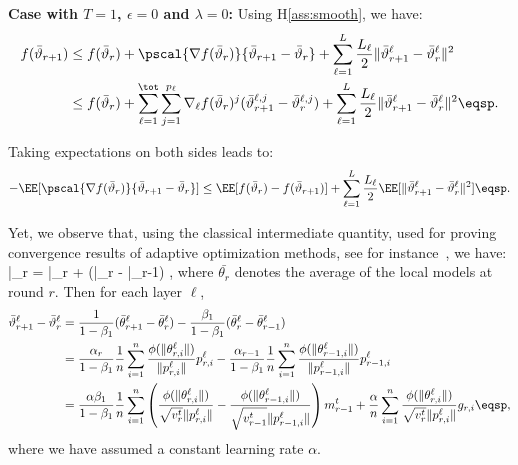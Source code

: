 \documentclass{article}
\begin{document}
\textbf{Case with $T=1$, $\epsilon = 0$ and $\lambda = 0$:}
Using H\ref{ass:smooth}, we have:
\begin{align}\notag
f(\bar{\vartheta}_{r+1}) &  \leq f(\bar{\vartheta}_r) + \pscal{\nabla f(\bar{\vartheta}_r)}{\bar{\vartheta}_{r+1} - \bar{\vartheta}_r} + \sum_{\ell =1}^L \frac{L_\ell}{2} \| \bar{\vartheta}^\ell_{r+1} - \bar{\vartheta}^\ell_r \|^2\\\notag
&  \leq f(\bar{\vartheta}_r) + \sum_{\ell=1}^\tot \sum_{j=1}^{p_\ell} \nabla_{\ell} f(\bar{\vartheta}_r)^j (\bar{\vartheta}^{\ell,j}_{r+1} - \bar{\vartheta}^{\ell,j}_r) + \sum_{\ell =1}^L \frac{L_\ell}{2} \| \bar{\vartheta}^\ell_{r+1} - \bar{\vartheta}^\ell_r \|^2  \eqsp.
\end{align}

Taking expectations on both sides leads to:
\begin{align}\label{eq:main}
- \EE[  \pscal{\nabla f(\bar{\vartheta}_r)}{\bar{\vartheta}_{r+1} - \bar{\vartheta}_r}]  \leq  \EE[ f(\bar{\vartheta}_r) - f(\bar{\vartheta}_{r+1})] + \sum_{\ell =1}^L \frac{L_\ell}{2} \EE[  \| \bar{\vartheta}^\ell_{r+1} - \bar{\vartheta}^\ell_r \|^2] \eqsp.
\end{align}

Yet, we observe that, using the classical intermediate quantity, used for proving convergence results of adaptive optimization methods, see for instance~\citep{RKK18}, we have:
\beq\label{eq:defseq}
\bar{\vartheta}_r = \bar{\theta}_r +  (\bar{\theta}_{r} - \bar{\theta}_{r-1}) \eqsp,
\eeq
where $\bar{\theta_r}$ denotes the average of the local models at round $r$.
Then for each layer $\ell$,
\begin{align}\label{eq:gap}
\bar{\vartheta}^\ell_{r+1} - \bar{\vartheta}^\ell_r  & = \frac{1}{1-\beta_1}(\bar{\theta}^\ell_{r+1} - \bar{\theta}^\ell_{r}) - \frac{\beta_1}{1-\beta_1}(\bar{\theta}^\ell_{r} - \bar{\theta}^\ell_{r-1})\\
& = \frac{\alpha_{r}}{1-\beta_1} \frac{1}{n} \sum_{i = 1}^n \frac{\phi(\|\theta_{r,i}^{\ell}\|)}{\|p_{r,i}^{\ell}\|} p_{r,i}^{\ell}  - \frac{\alpha_{r-1}}{1-\beta_1} \frac{1}{n} \sum_{i = 1}^n \frac{\phi(\|\theta_{r-1,i}^{\ell}\|)}{\|p_{r-1,i}^{\ell}\|} p_{r-1,i}^{\ell}\\
& = \frac{\alpha \beta_1}{1-\beta_1} \frac{1}{n}  \sum_{i = 1}^n  \left( \frac{\phi(\|\theta_{r,i}^{\ell}\|)}{\sqrt{v^{t}_{r}} \|p_{r,i}^{\ell}\|} - \frac{\phi(\|\theta_{r-1,i}^{\ell}\|)}{\sqrt{v^{t}_{r-1}} \|p_{r-1,i}^{\ell}\|} \right) m^{t}_{r-1} + \frac{\alpha}{n} \sum_{i = 1}^n \frac{\phi(\|\theta_{r,i}^{\ell}\|)}{\sqrt{v^{t}_{r}} \|p_{r,i}^{\ell}\|} g_{r,i} \eqsp,
\end{align}
where we have assumed a constant learning rate $\alpha$.
\end{document}
